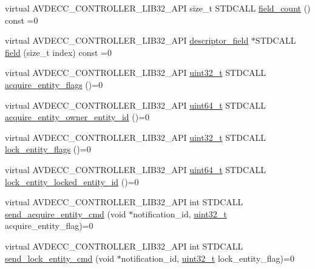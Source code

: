 \begin{DoxyCompactItemize}
virtual A\+V\+D\+E\+C\+C\+\_\+\+C\+O\+N\+T\+R\+O\+L\+L\+E\+R\+\_\+\+L\+I\+B32\+\_\+\+A\+PI size\+\_\+t S\+T\+D\+C\+A\+LL \hyperlink{classavdecc__lib_1_1descriptor__base_ab1edf4996377ed957088a7b3b16aca7d}{field\+\_\+count} () const =0
\item 
virtual A\+V\+D\+E\+C\+C\+\_\+\+C\+O\+N\+T\+R\+O\+L\+L\+E\+R\+\_\+\+L\+I\+B32\+\_\+\+A\+PI \hyperlink{classavdecc__lib_1_1descriptor__field}{descriptor\+\_\+field} $\ast$S\+T\+D\+C\+A\+LL \hyperlink{classavdecc__lib_1_1descriptor__base_aa3716832eed0b6f6dcfba358c5d2c601}{field} (size\+\_\+t index) const =0
\item 
virtual A\+V\+D\+E\+C\+C\+\_\+\+C\+O\+N\+T\+R\+O\+L\+L\+E\+R\+\_\+\+L\+I\+B32\+\_\+\+A\+PI \hyperlink{parse_8c_a6eb1e68cc391dd753bc8ce896dbb8315}{uint32\+\_\+t} S\+T\+D\+C\+A\+LL \hyperlink{classavdecc__lib_1_1descriptor__base_a42f2a796375edd05c8d29856c018042d}{acquire\+\_\+entity\+\_\+flags} ()=0
\item 
virtual A\+V\+D\+E\+C\+C\+\_\+\+C\+O\+N\+T\+R\+O\+L\+L\+E\+R\+\_\+\+L\+I\+B32\+\_\+\+A\+PI \hyperlink{parse_8c_aec6fcb673ff035718c238c8c9d544c47}{uint64\+\_\+t} S\+T\+D\+C\+A\+LL \hyperlink{classavdecc__lib_1_1descriptor__base_a6480d803970d505ce7a9b429a6eb71bd}{acquire\+\_\+entity\+\_\+owner\+\_\+entity\+\_\+id} ()=0
\item 
virtual A\+V\+D\+E\+C\+C\+\_\+\+C\+O\+N\+T\+R\+O\+L\+L\+E\+R\+\_\+\+L\+I\+B32\+\_\+\+A\+PI \hyperlink{parse_8c_a6eb1e68cc391dd753bc8ce896dbb8315}{uint32\+\_\+t} S\+T\+D\+C\+A\+LL \hyperlink{classavdecc__lib_1_1descriptor__base_a757e66272bba4c52cefa914df8c60bb5}{lock\+\_\+entity\+\_\+flags} ()=0
\item 
virtual A\+V\+D\+E\+C\+C\+\_\+\+C\+O\+N\+T\+R\+O\+L\+L\+E\+R\+\_\+\+L\+I\+B32\+\_\+\+A\+PI \hyperlink{parse_8c_aec6fcb673ff035718c238c8c9d544c47}{uint64\+\_\+t} S\+T\+D\+C\+A\+LL \hyperlink{classavdecc__lib_1_1descriptor__base_a052b47529d0e60ca87894159fcb65e14}{lock\+\_\+entity\+\_\+locked\+\_\+entity\+\_\+id} ()=0
\item 
virtual A\+V\+D\+E\+C\+C\+\_\+\+C\+O\+N\+T\+R\+O\+L\+L\+E\+R\+\_\+\+L\+I\+B32\+\_\+\+A\+PI int S\+T\+D\+C\+A\+LL \hyperlink{classavdecc__lib_1_1descriptor__base_adfd0cf2a51bff7d762b0efc743480c48}{send\+\_\+acquire\+\_\+entity\+\_\+cmd} (void $\ast$notification\+\_\+id, \hyperlink{parse_8c_a6eb1e68cc391dd753bc8ce896dbb8315}{uint32\+\_\+t} acquire\+\_\+entity\+\_\+flag)=0
\item 
virtual A\+V\+D\+E\+C\+C\+\_\+\+C\+O\+N\+T\+R\+O\+L\+L\+E\+R\+\_\+\+L\+I\+B32\+\_\+\+A\+PI int S\+T\+D\+C\+A\+LL \hyperlink{classavdecc__lib_1_1descriptor__base_a1ac1f5c700f4eebd37b7c45498b36bbc}{send\+\_\+lock\+\_\+entity\+\_\+cmd} (void $\ast$notification\+\_\+id, \hyperlink{parse_8c_a6eb1e68cc391dd753bc8ce896dbb8315}{uint32\+\_\+t} lock\+\_\+entity\+\_\+flag)=0

\end{DoxyCompactItemize}
